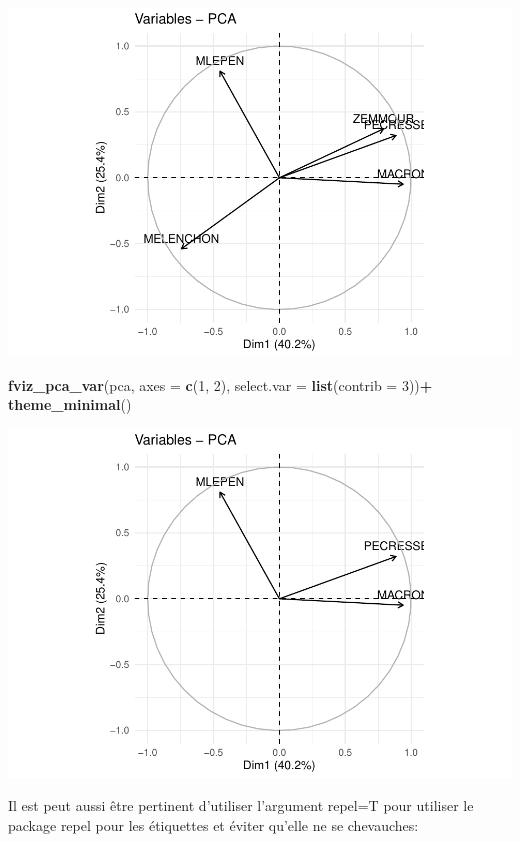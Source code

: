 \documentclass[
]{book}
\newenvironment{Shaded}{\begin{snugshade}}{\end{snugshade}}
\newcommand{\AttributeTok}[1]{\textcolor[rgb]{0.13,0.29,0.53}{#1}}
\newcommand{\DecValTok}[1]{\textcolor[rgb]{0.00,0.00,0.81}{#1}}
\newcommand{\FunctionTok}[1]{\textcolor[rgb]{0.13,0.29,0.53}{\textbf{#1}}}
\newcommand{\NormalTok}[1]{#1}
\newcommand{\SpecialCharTok}[1]{\textcolor[rgb]{0.81,0.36,0.00}{\textbf{#1}}}
\begin{document}
\includegraphics{manuel_geo_quanti_files/figure-latex/unnamed-chunk-66-3.pdf}

\begin{Shaded}
\begin{Highlighting}[]
\FunctionTok{fviz\_pca\_var}\NormalTok{(pca,  }\AttributeTok{axes =} \FunctionTok{c}\NormalTok{(}\DecValTok{1}\NormalTok{, }\DecValTok{2}\NormalTok{), }\AttributeTok{select.var =} \FunctionTok{list}\NormalTok{(}\AttributeTok{contrib =} \DecValTok{3}\NormalTok{))}\SpecialCharTok{+} \FunctionTok{theme\_minimal}\NormalTok{()}
\end{Highlighting}
\end{Shaded}

\includegraphics{manuel_geo_quanti_files/figure-latex/unnamed-chunk-66-4.pdf}

Il est peut aussi être pertinent d'utiliser l'argument repel=T pour utiliser le package repel pour les étiquettes et éviter qu'elle ne se chevauches:
\end{document}
